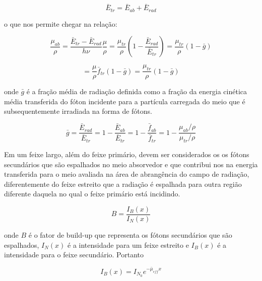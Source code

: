 \documentclass[11pt,a4paper]{article}
\begin{document}
                \begin{equation}
                    \bar{E}_{tr} = \bar{E}_{ab} + \bar{E}_{rad}
                \end{equation}

            \noindent o que nos permite chegar na relação:

                $$\frac{\mu_{ab}}{\rho} = \frac{\bar{E}_{tr} - \bar{E}_{rad}}{h \nu} \frac{\mu}{\rho} = \frac{\mu_{tr}}{\rho} \left(1 - \frac{\bar{E}_{rad}}{\bar{E}_{tr}}\right) = \frac{\mu_{tr}}{\rho} (1 - \bar{g}) $$

                \begin{equation}
                    = \frac{\mu}{\rho}\bar{f}_{tr}(1 - \bar{g}) = \frac{\mu_{tr}}{\rho}(1 - \bar{g})
                \end{equation}

            \noindent onde $\bar{g}$ é a fração média de radiação definida como a fração da energia cinética média transferida do fóton incidente para a partícula carregada do meio que é subsequentemente irradiada na forma de fótons.

                \begin{equation}
                    \bar{g} = \frac{\bar{E}_{rad}}{\bar{E}_{tr}} 
                    = 1 - \frac{\bar{E}_{ab}}{\bar{E}_{tr}}
                    = 1 - \frac{\bar{f}_{ab}}{\bar{f}_{tr}}
                    = 1 - \frac{\mu_{ab}/ \rho}{\mu_{tr}/ \rho}
                \end{equation}

                
            Em um feixe largo, além do feixe primário, devem ser considerados os os fótons secundários que são espalhados no meio absorvedor e que contribui nos na energia transferida para o meio avaliada na área de abrangência do campo de radiação, diferentemente do feixe estreito que a radiação é espalhada para outra região diferente daquela no qual o feixe primário está incidindo. 

                \begin{equation}
                    B = \frac{I_B(x)}{I_N(x)} 
                \end{equation}

            \noindent onde $B$ é o fator de build-up que representa os fótons secundários que são espalhados, $I_N(x)$ é a intensidade para um feixe estreito e $I_B(x)$ é a intensidade para o feixe secundário. Portanto

                \begin{equation}
                    I_B(x) = I_{N_0} e^{- \bar{\mu}_{eff} x}
                \end{equation}
\end{document}
